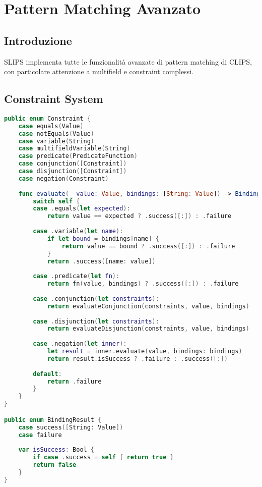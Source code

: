 
\chapter{Pattern Matching Avanzato}
\label{cap:slips_pattern_matching}

\section{Introduzione}

SLIPS implementa tutte le funzionalità avanzate di pattern matching di CLIPS, con particolare attenzione a multifield e constraint complessi.

\section{Constraint System}

\begin{lstlisting}[language=Swift]
public enum Constraint {
    case equals(Value)
    case notEquals(Value)
    case variable(String)
    case multifieldVariable(String)
    case predicate(PredicateFunction)
    case conjunction([Constraint])
    case disjunction([Constraint])
    case negation(Constraint)
    
    func evaluate(_ value: Value, bindings: [String: Value]) -> BindingResult {
        switch self {
        case .equals(let expected):
            return value == expected ? .success([:]) : .failure
            
        case .variable(let name):
            if let bound = bindings[name] {
                return value == bound ? .success([:]) : .failure
            }
            return .success([name: value])
            
        case .predicate(let fn):
            return fn(value, bindings) ? .success([:]) : .failure
            
        case .conjunction(let constraints):
            return evaluateConjunction(constraints, value, bindings)
            
        case .disjunction(let constraints):
            return evaluateDisjunction(constraints, value, bindings)
            
        case .negation(let inner):
            let result = inner.evaluate(value, bindings: bindings)
            return result.isSuccess ? .failure : .success([:])
            
        default:
            return .failure
        }
    }
}

public enum BindingResult {
    case success([String: Value])
    case failure
    
    var isSuccess: Bool {
        if case .success = self { return true }
        return false
    }
}
\end{lstlisting}

